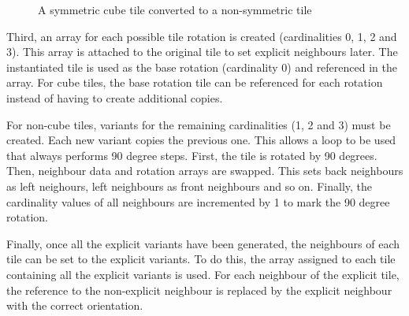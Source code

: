 \begin{figure}[H]
{\begin{minipage}[b]{0.45\linewidth}
        \end{minipage}
        \label{fig:cubeSymmetryConversion2}
    }
    \caption{A symmetric cube tile converted to a non-symmetric tile}
    \label{fig:cubeSymmetryConversion}
\end{figure}

Third, an array for each possible tile rotation is created (cardinalities 0, 1, 2 and 3). This array is attached to the original tile to set explicit neighbours later. The instantiated tile is used as the base rotation (cardinality 0) and referenced in the array. For cube tiles, the base rotation tile can be referenced for each rotation instead of having to create additional copies.


For non-cube tiles, variants for the remaining cardinalities (1, 2 and 3) must be created. Each new variant copies the previous one. This allows a loop to be used that always performs 90 degree steps. First, the tile is rotated by 90 degrees. Then, neighbour data and rotation arrays are swapped. This sets back neighbours as left neighours, left neighbours as front neighbours and so on. Finally, the cardinality values of all neighbours are incremented by 1 to mark the 90 degree rotation.


Finally, once all the explicit variants have been generated, the neighbours of each tile can be set to the explicit variants. To do this, the array assigned to each tile containing all the explicit variants is used. For each neighbour of the explicit tile, the reference to the non-explicit neighbour is replaced by the explicit neighbour with the correct orientation.


